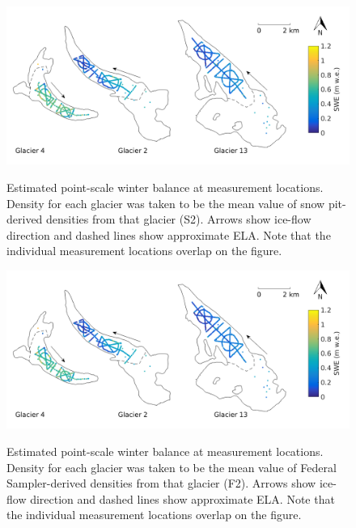 \documentclass{sfuthesis}
\begin{document}
\begin{figure}[H]
	\centering
	\includegraphics[width =\textwidth]{SWEmap_opt4.png}\\
	\caption{Estimated point-scale winter balance at measurement locations. Density for each glacier was taken to be the mean value of snow pit-derived densities from that glacier (S2). Arrows show ice-flow direction and dashed lines show approximate ELA. Note that the individual measurement locations overlap on the figure.}
	\label{fig:SWEmap_S2}
\end{figure}

\begin{figure}[H]
	\centering
	\includegraphics[width = \textwidth]{SWEmap_opt5.png}\\
	\caption{Estimated point-scale winter balance at measurement locations. Density for each glacier was taken to be the mean value of Federal Sampler-derived densities from that glacier (F2). Arrows show ice-flow direction and dashed lines show approximate ELA. Note that the individual measurement locations overlap on the figure.}
	\label{fig:SWEmap_F2}
\end{figure}
\end{document}
